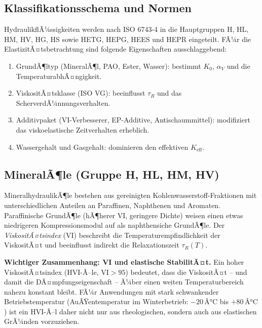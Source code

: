 ﻿\documentclass[a4paper,12pt]{scrreprt}
\theoremstyle{definition}
\begin{document}
\subsection{Klassifikationsschema und Normen}

HydraulikflÃ¼ssigkeiten werden nach ISO 6743-4 in die Hauptgruppen H, HL,
HM, HV, HG, HS sowie HETG, HEPG, HEES und HEPR eingeteilt. FÃ¼r die
ElastizitÃ¤tsbetrachtung sind folgende Eigenschaften ausschlaggebend:

\begin{enumerate}
  \item GrundÃ¶ltyp (MineralÃ¶l, PAO, Ester, Wasser): bestimmt $K_0$, $\alpha_V$
    und die TemperaturabhÃ¤ngigkeit.
  \item ViskositÃ¤tsklasse (ISO VG): beeinflusst $\tau_R$ und das
    ScherverdÃ¼nnungsverhalten.
  \item Additivpaket (VI-Verbesserer, EP-Additive, Antischaummittel):
    modifiziert das viskoelastische Zeitverhalten erheblich.
  \item Wassergehalt und Gasgehalt: dominieren den effektiven $K_{\mathrm{eff}}$.
\end{enumerate}

\subsection{MineralÃ¶le (Gruppe H, HL, HM, HV)}

MineralhydraulikÃ¶le bestehen aus gereinigten Kohlenwasserstoff-Fraktionen
mit unterschiedlichen Anteilen an Paraffinen, Naphthenen und Aromaten.
Paraffinische GrundÃ¶le (hÃ¶herer VI, geringere Dichte) weisen einen etwas
niedrigeren Kompressionsmodul auf als naphthensiche GrundÃ¶le. Der
\emph{ViskositÃ¤tsindex} (VI) beschreibt die Temperaturempfindlichkeit
der ViskositÃ¤t und beeinflusst indirekt die Relaxationszeit $\tau_R(T)$.

\begin{infobox}
\textbf{Wichtiger Zusammenhang: VI und elastische StabilitÃ¤t.}
Ein hoher ViskositÃ¤tsindex (HVI-Ã–le, $\mathrm{VI} > 95$) bedeutet, dass
die ViskositÃ¤t -- und damit die DÃ¤mpfungseigenschaft -- Ã¼ber einen weiten
Temperaturbereich nahezu konstant bleibt. FÃ¼r Anwendungen mit stark
schwankender Betriebstemperatur (AuÃŸentemperatur im Winterbetrieb:
$-20\,Â°\mathrm{C}$ bis $+80\,Â°\mathrm{C}$) ist ein HVI-Ã–l daher nicht
nur aus rheologischen, sondern auch aus elastischen GrÃ¼nden vorzuziehen.
\end{infobox}
\end{document}

